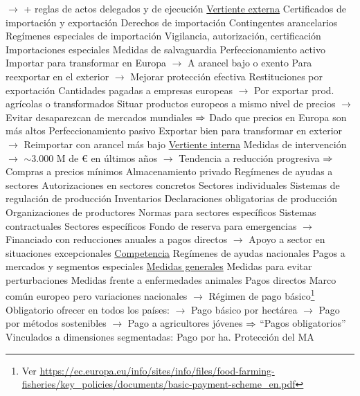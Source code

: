\documentclass{nuevotema}
\begin{document}
\begin{esquemal}
				\4[] $\to$ + reglas de actos delegados y de ejecución
				\4[] \underline{Vertiente externa}
				\4 Certificados de importación y exportación
				\4 Derechos de importación
				\4 Contingentes arancelarios
				\4 Regímenes especiales de importación
				\4[] Vigilancia, autorización, certificación
				\4 Importaciones especiales
				\4 Medidas de salvaguardia
				\4 Perfeccionamiento activo
				\4[] Importar para transformar en Europa
				\4[] $\to$ A arancel bajo o exento
				\4[] Para reexportar en el exterior
				\4[] $\to$ Mejorar protección efectiva
				\4 Restituciones por exportación
				\4[] Cantidades pagadas a empresas europeas
				\4[] $\to$ Por exportar prod. agrícolas o transformados
				\4[] Situar productos europeos a mismo nivel de precios
				\4[] $\to$ Evitar desaparezcan de mercados mundiales
				\4[] $\Rightarrow$ Dado que precios en Europa son más altos
				\4 Perfeccionamiento pasivo
				\4[] Exportar bien para transformar en exterior
				\4[] $\to$ Reimportar con arancel más bajo
				\4[] \underline{Vertiente interna}
				\4 Medidas de intervención
				\4[] $\to$ $\sim 3.000$ M de € en últimos años
				\4[] $\to$ Tendencia a reducción progresiva
				\4[] $\Rightarrow$ Compras a precios mínimos
				\4 Almacenamiento privado
				\4 Regímenes de ayudas a sectores
				\4 Autorizaciones en sectores concretos
				\4 Sectores individuales
				\4[] Sistemas de regulación de producción
				\4[] Inventarios
				\4[] Declaraciones obligatorias de producción
				\4 Organizaciones de productores
				\4[] Normas para sectores específicos
				\4[] Sistemas contractuales
				\4[] Sectores específicos
				\4 Fondo de reserva para emergencias
				\4[] $\to$ Financiado con reducciones anuales a pagos directos
				\4[] $\to$ Apoyo a sector en situaciones excepcionales
				\4[] \underline{Competencia}
				\4 Regímenes de ayudas nacionales
				\4 Pagos a mercados y segmentos especiales
				\4[] \underline{Medidas generales}
				\4 Medidas para evitar perturbaciones
				\4 Medidas frente a enfermedades animales
			\3 {Pagos directos}
				\4 Marco común europeo pero variaciones nacionales
				\4[] $\to$ Régimen de pago básico\footnote{Ver \url{https://ec.europa.eu/info/sites/info/files/food-farming-fisheries/key_policies/documents/basic-payment-scheme_en.pdf}}
				\4 Obligatorio ofrecer en todos los países:
				\4[] $\to$ Pago básico por hectárea
				\4[] $\to$ Pago por métodos sostenibles
				\4[] $\to$ Pago a agricultores jóvenes
				\4[] $\Rightarrow$ ``Pagos obligatorios''
				\4 Vinculados a dimensiones segmentadas:
				\4[1] Pago por ha.
				\4[2] Protección del MA

\end{esquemal}
\end{document}

